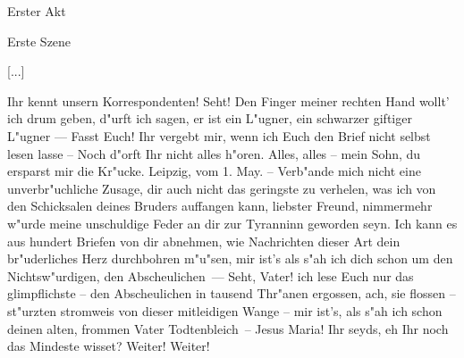 
\begin{center}

\Large{Erster Akt}

\large{Erste Szene}

\end{center}


[...]

\begin{drama}

\franspeaks {} Ihr kennt unsern Korrespondenten! Seht! Den Finger meiner rechten Hand wollt' ich drum geben, d"urft ich sagen, er ist ein L"ugner, ein schwarzer giftiger L"ugner --- Fasst Euch! Ihr vergebt mir, wenn ich Euch den Brief nicht selbst lesen lasse -- Noch d"orft Ihr nicht alles h"oren.
\moorspeaks {} Alles, alles -- mein Sohn, du ersparst mir die Kr"ucke.
\franspeaks {} \frqq Leipzig, vom 1. May. -- Verb"ande mich nicht eine unverbr"uchliche Zusage, dir auch nicht das geringste zu verhelen, was ich von den Schicksalen deines Bruders auffangen kann, liebster Freund, nimmermehr w"urde meine unschuldige Feder an dir zur Tyranninn geworden seyn. Ich kann es aus hundert Briefen von dir abnehmen, wie Nachrichten dieser Art dein br"uderliches Herz durchbohren m"u"sen, mir ist's als s"ah ich dich schon um den Nichtsw"urdigen, den Abscheulichen\flqq \ ---  Seht, Vater! ich lese Euch nur das glimpflichste -- \frqq den Abscheulichen in tausend Thr"anen ergossen\flqq , ach, sie flossen -- st"urzten stromweis von dieser mitleidigen Wange -- \frqq mir ist's, als s"ah ich schon deinen alten, frommen Vater Todtenbleich\flqq \ -- Jesus Maria! Ihr seyds, eh Ihr noch das Mindeste wisset?
\moorspeaks {} Weiter! Weiter!




\end{drama}
